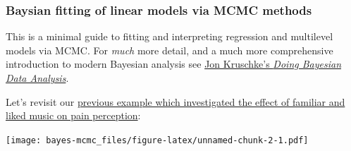 \documentclass[]{article}
\newenvironment{Shaded}{\begin{snugshade}}{\end{snugshade}}
\newcommand{\KeywordTok}[1]{\textcolor[rgb]{0.13,0.29,0.53}{\textbf{#1}}}
\newcommand{\DataTypeTok}[1]{\textcolor[rgb]{0.13,0.29,0.53}{#1}}
\newcommand{\StringTok}[1]{\textcolor[rgb]{0.31,0.60,0.02}{#1}}
\newcommand{\OperatorTok}[1]{\textcolor[rgb]{0.81,0.36,0.00}{\textbf{#1}}}
\newcommand{\NormalTok}[1]{#1}
\theoremstyle{definition}
\theoremstyle{definition}
\theoremstyle{definition}
\theoremstyle{remark}
\begin{document}
\subsubsection*{Baysian fitting of linear models via MCMC
methods}\label{baysian-fitting-of-linear-models-via-mcmc-methods}

This is a minimal guide to fitting and interpreting regression and
multilevel models via MCMC. For \emph{much} more detail, and a much more
comprehensive introduction to modern Bayesian analysis see
\href{http://www.indiana.edu/~kruschke/DoingBayesianDataAnalysis/}{Jon
Kruschke's \emph{Doing Bayesian Data Analysis}}.

Let's revisit our \protect\hyperlink{pain-music-data}{previous example
which investigated the effect of familiar and liked music on pain
perception}:

\begin{Shaded}
\end{Shaded}

\texttt{[image: bayes-mcmc\_files/figure-latex/unnamed-chunk-2-1.pdf]}
\end{document}
